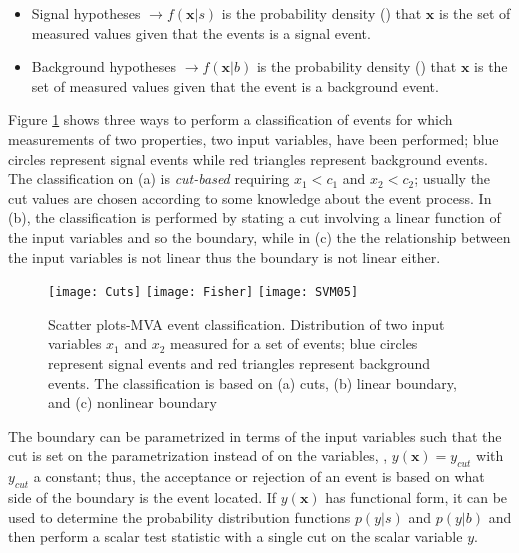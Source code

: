 \begin{itemize}
\item Signal hypotheses $\to f(\textbf{x}|s)$ is the probability density () that $\textbf{x}$ is the set of measured values given that the events is a signal event. 
\item Background hypotheses $ \to f(\textbf{x}|b)$ is the probability density () that $\textbf{x}$ is the set of measured values given that the event is a background event.
\end{itemize}

Figure \ref{fig:scatter_plot} shows three ways to perform a classification of events for which measurements of two properties, two input variables, have been performed; blue circles represent signal events while red triangles represent background events. The classification on (a) is \textit{cut-based} requiring $x_1<c_1$ and $x_2<c_2$; usually the cut values are chosen according to some knowledge about the event process. In (b), the classification is performed by stating a cut involving a linear function of the input variables and so the boundary, while in (c) the the relationship between the input variables is not linear thus the boundary is not linear either.          

\begin{figure}[!h]
  \centering
  \texttt{[image: Cuts]}
  \texttt{[image: Fisher]}
  \texttt{[image: SVM05]}
  \caption[Scatter plots-MVA event classification.]{Scatter plots-MVA event classification. Distribution of two input variables $x_1$ and $x_2$ measured for a set of events; blue circles represent signal events and red triangles represent background events. The classification is based on (a) cuts, (b) linear boundary, and (c) nonlinear boundary\cite{mva}}\label{fig:scatter_plot}
\end{figure}

The boundary can be parametrized in terms of the input variables such that the cut is set on the parametrization instead of on the variables, \ie, $y(\textbf{x})=y_{cut}$ with $y_{cut}$ a constant; thus, the acceptance or rejection of an event is based on what side of the boundary is the event located. If $y(\textbf{x})$ has functional form, it can be used to determine the probability distribution functions $p(y|s)$ and $p(y|b)$ and then perform a scalar test statistic with a single cut on the scalar variable $y$. 

